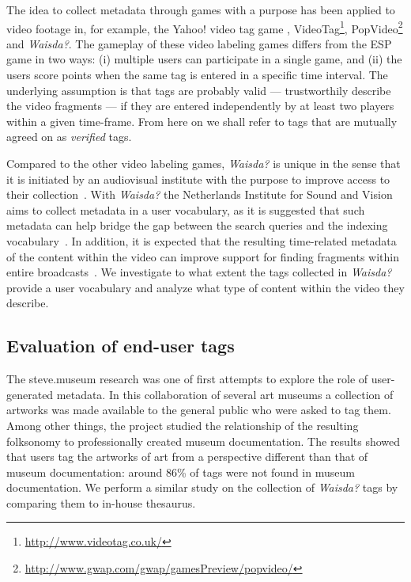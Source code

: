 The idea to collect metadata through games with a purpose has been applied to
video footage in, for example, the Yahoo! video tag game
\cite{WWW08_vanZwol_etal},
VideoTag\footnote{\url{http://www.videotag.co.uk/}},
PopVideo\footnote{\url{http://www.gwap.com/gwap/gamesPreview/popvideo/}} and
\emph{Waisda?}. The gameplay of these video labeling games differs from the
ESP game in two ways: (i) multiple users can participate in a single game, and
(ii) the users score points when the same tag is entered in a specific time
interval. The underlying assumption is that tags are probably valid ---
trustworthily describe the video fragments --- if they are entered
independently by at least two players within a given time-frame. From here on
we shall refer to tags that are mutually agreed on as \textit{verified} tags.

Compared to the other video labeling games, \emph{Waisda?} is unique in the
sense that it is initiated by an audiovisual institute with the purpose to
improve access to their collection~\cite{johanwebsci}. With \emph{Waisda?} the
Netherlands Institute for Sound and Vision aims to collect metadata in a user
vocabulary, as it is suggested that such metadata can help bridge the gap
between the search queries and the indexing vocabulary~\cite{Jorgensen2007}.
In addition, it is expected that the resulting time-related metadata of the
content within the video can improve support for finding fragments within
entire broadcasts~\cite{bouke}. We investigate to what extent the tags
collected in \emph{Waisda?} provide a user vocabulary and analyze what type of
content within the video they describe.

\subsection{Evaluation of end-user tags}

The steve.museum research \cite{MATW2009:Leason} was one of first attempts to explore
the role of user-generated metadata. In this collaboration of several art
museums a collection of artworks was made available to the general public who
were asked to tag them. Among other things, the project studied the
relationship of the resulting folksonomy to professionally created museum
documentation. The results showed that users tag the artworks of art from a
perspective different than that of museum documentation: around 86\% of tags
were not found in museum documentation. We perform a similar study on the
collection of \emph{Waisda?} tags by comparing them to in-house thesaurus.

